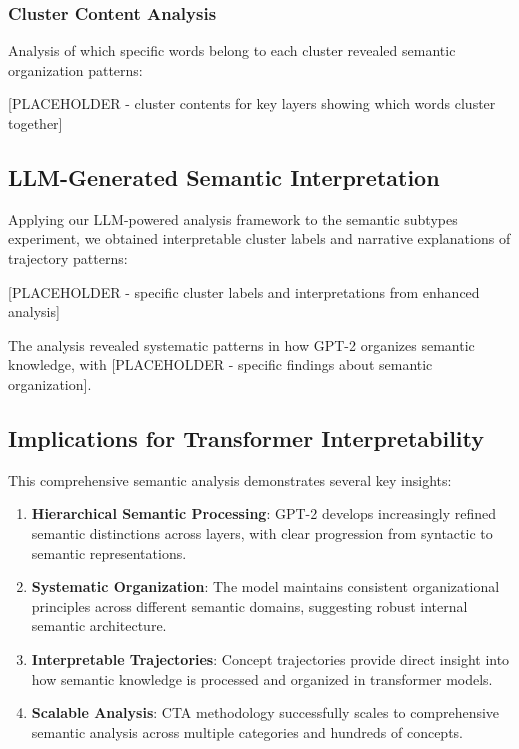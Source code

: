 \subsubsection{Cluster Content Analysis}

Analysis of which specific words belong to each cluster revealed semantic organization patterns:

[PLACEHOLDER - cluster contents for key layers showing which words cluster together]

\subsection{LLM-Generated Semantic Interpretation}

Applying our LLM-powered analysis framework to the semantic subtypes experiment, we obtained interpretable cluster labels and narrative explanations of trajectory patterns:

[PLACEHOLDER - specific cluster labels and interpretations from enhanced analysis]

The analysis revealed systematic patterns in how GPT-2 organizes semantic knowledge, with [PLACEHOLDER - specific findings about semantic organization].

\subsection{Implications for Transformer Interpretability}

This comprehensive semantic analysis demonstrates several key insights:

\begin{enumerate}
    \item \textbf{Hierarchical Semantic Processing}: GPT-2 develops increasingly refined semantic distinctions across layers, with clear progression from syntactic to semantic representations.
    
    \item \textbf{Systematic Organization}: The model maintains consistent organizational principles across different semantic domains, suggesting robust internal semantic architecture.
    
    \item \textbf{Interpretable Trajectories}: Concept trajectories provide direct insight into how semantic knowledge is processed and organized in transformer models.
    
    \item \textbf{Scalable Analysis}: CTA methodology successfully scales to comprehensive semantic analysis across multiple categories and hundreds of concepts.
\end{enumerate}

